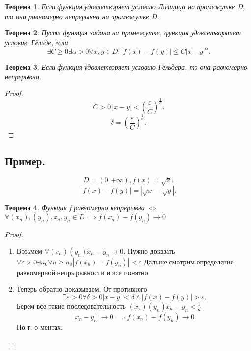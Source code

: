 \documentclass{scrartcl}
\newtheorem{theorem}{Теорема}
\begin{document}
    \begin{theorem}
        Если функция удовлетворяет условию Липщица на промежутке D, то она равномерно
        непрерывна на промежутке D.
    \end{theorem}
    \begin{theorem}
        Пусть функция задана на промежутке, функция удовлетворятет условию Гёльде, 
        если
        \[
        \exists  C \ge  0 \exists  \alpha > 0 \forall  x, y \in D : |f(x)-f(y)|\le  C|x - y|^{\alpha}
        .\] 
    \end{theorem}
    \begin{theorem}
        Если функция удовлетворяет условию Гёльдера, то она равномерно непрерывна.
    \end{theorem}
    \begin{proof}
        \[
        C > 0 ~  |x - y| < (\frac{\varepsilon}{C})^{\frac{1}{\alpha}}
        .\] 
        \[
        \delta = (\frac{\varepsilon}{C})^{\frac{1}{\alpha}}
        .\] 
    \end{proof}
     \subsection{Пример.}
     \[
         D = (0,+\infty) , f(x) = \sqrt{x} 
     .\] 
     \[
     |f(x) - f(y)| = |\sqrt{x}  - \sqrt{y} |
     .\] 
     \begin{theorem}
         Функция f равномерно непрерывна $\iff$ $\forall  (x_{n}), (y_{n}), x_{n}, y_{n} \in D 
         \implies f(x_{n}) - f(y_{n}) \to 0$
     \end{theorem}
     \begin{proof}
         \begin{enumerate}
             \item 
                 Возьмем $\forall (x_{n}) (y_{n}) x_{n} - y_{n} \to 0$.
                 Нужно доказать $\forall \varepsilon >0 \exists  n_0 \forall  n\ge n_0
                 |f(x_{n}) - f(y_{n})| < \varepsilon$
                 Дальше смотрим определение равномерной непрырывности и все понятно.
            \item
                Теперь обратно доказываем. От противного
                \[
                \exists  \varepsilon > 0 \forall \delta > 0 |x - y| < \delta \land |f(x) - f(y)| > \varepsilon
                .\] 
                Берем все такие последовательность $(x_{n}) (y_{n}) x_{n} - y_{n} < \frac{1}{n}$ 
                \[
                |x_{n} - y_{n}| \to 0 \implies f(x_{n}) - f(y_{n}) \to 0
                .\] 
                По т. о ментах.
         \end{enumerate}
     \end{proof}
\end{document}
